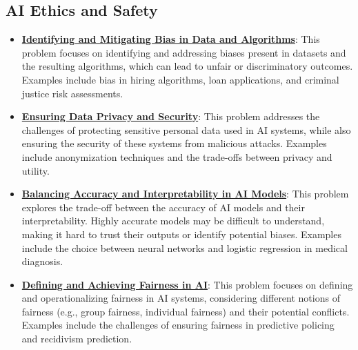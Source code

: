 \documentclass{article}%
\begin{document}
%
\subsection{AI Ethics and Safety}%
\label{subsec:AIEthicsandSafety}%
\begin{itemize}[leftmargin=*]%
\item \href{https://www.math.purdue.edu/~yipn/351/16L2-ethics.pdf#page=2}{\textbf{Identifying and Mitigating Bias in Data and Algorithms}}: This problem focuses on identifying and addressing biases present in datasets and the resulting algorithms, which can lead to unfair or discriminatory outcomes. Examples include bias in hiring algorithms, loan applications, and criminal justice risk assessments.%
\item \href{https://www.math.purdue.edu/~yipn/351/16L2-ethics.pdf#page=10}{\textbf{Ensuring Data Privacy and Security}}: This problem addresses the challenges of protecting sensitive personal data used in AI systems, while also ensuring the security of these systems from malicious attacks. Examples include anonymization techniques and the trade-offs between privacy and utility.%
\item \href{https://www.math.purdue.edu/~yipn/351/16L2-ethics.pdf#page=28}{\textbf{Balancing Accuracy and Interpretability in AI Models}}: This problem explores the trade-off between the accuracy of AI models and their interpretability. Highly accurate models may be difficult to understand, making it hard to trust their outputs or identify potential biases. Examples include the choice between neural networks and logistic regression in medical diagnosis.%
\item \href{https://www.math.purdue.edu/~yipn/351/16L2-ethics.pdf#page=18}{\textbf{Defining and Achieving Fairness in AI}}: This problem focuses on defining and operationalizing fairness in AI systems, considering different notions of fairness (e.g., group fairness, individual fairness) and their potential conflicts. Examples include the challenges of ensuring fairness in predictive policing and recidivism prediction.%
\end{itemize}

%
\end{document}
